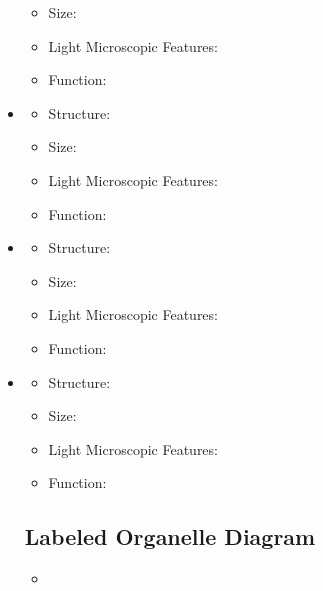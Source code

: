 \begin{itemize}
\begin{itemize}
    \item Size:
    \item Light Microscopic Features:
    \item Function:
  \end{itemize}
  \item {}
  \begin{itemize}
    \item Structure:
    \item Size:
    \item Light Microscopic Features:
    \item Function:
  \end{itemize}
  \item {}
  \begin{itemize}
    \item Structure:
    \item Size:
    \item Light Microscopic Features:
    \item Function:
  \end{itemize}
  \item {}
  \begin{itemize}
    \item Structure:
    \item Size:
    \item Light Microscopic Features:
    \item Function:
  \end{itemize}

  \subsection{Labeled Organelle Diagram}
  \begin{itemize}
    \item 
  \end{itemize}
  

\end{itemize}
